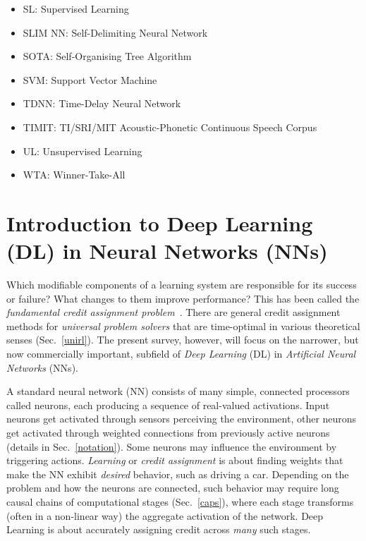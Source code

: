 \documentclass[letterpaper]{article}
\begin{document}
\begin{CJK*}{UTF8}{gbsn}
\begin{multicols}{2}
\begin{itemize}[leftmargin=0cm,itemindent=0cm,labelwidth=\itemindent,labelsep=0cm,align=left,noitemsep,nolistsep]
\item[] SL: Supervised Learning 
\item[] SLIM NN: Self-Delimiting  Neural Network  
\item[] SOTA: Self-Organising Tree Algorithm
\item[] SVM: Support Vector Machine 
\item[] TDNN: Time-Delay Neural Network 
\item[] TIMIT: TI/SRI/MIT Acoustic-Phonetic Continuous Speech Corpus
\item[] UL: Unsupervised Learning 
\item[] WTA:  Winner-Take-All   
\end{itemize}
\end{multicols}



\section{Introduction to Deep Learning (DL) in Neural Networks (NNs)}
\label{intro}

Which modifiable components of a learning system are responsible for its success or failure?
What changes to them improve performance? 
This has been called the {\em fundamental credit assignment problem}~\citep{Minsky:63}.
There are general credit assignment methods for {\em universal problem solvers} 
that are 
time-optimal in various theoretical senses
(Sec.~\ref{unirl}).
The present survey, however, will focus on the narrower, but now commercially important, subfield
of {\em Deep Learning} (DL) in {\em Artificial Neural Networks} (NNs).


A standard neural network (NN) consists of many simple, connected
processors called neurons, each producing a sequence of real-valued
activations.  Input neurons get activated through sensors perceiving the
environment, other neurons get activated through weighted 
connections from previously active neurons (details in Sec.~\ref{notation}).  
Some neurons may influence the environment
by triggering actions.  {\em Learning} or {\em credit assignment} is
about finding weights that make the NN exhibit {\em desired} behavior,
such as driving a car.  Depending on the problem and how the neurons
are connected, such behavior may require long causal chains of
computational stages (Sec.~\ref{caps}), where each stage transforms
(often in a non-linear way) the aggregate activation of the
network. Deep Learning is about accurately assigning credit across
{\em many} such stages.




\end{CJK*}
\end{document}
